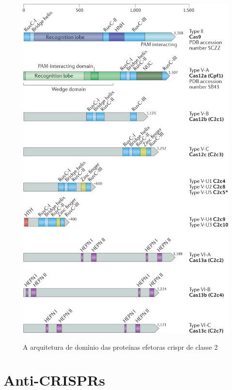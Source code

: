 \documentclass{report}
\begin{document}
\begin{figure}[h]
\center
\includegraphics[scale=1]{nihms945745f2}
\label{fig:nihms945745f2}
\caption {A arquitetura de domínio das proteínas efetoras \ac{crispr} de classe 2}
\end{figure}



\chapter{Anti-CRISPRs}
\label{chap.anti-CRISPRs}
\end{document}
